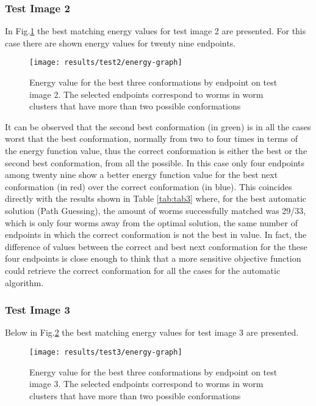 \subsubsection*{Test Image 2}

In Fig.\ref{fig:energy2} the best matching energy values for 
test image 2 are presented. For this case there are shown energy values
for twenty nine endpoints.

\begin{figure}[h!]
 \centering
   \texttt{[image: results/test2/energy-graph]}
 \caption{Energy value for the best three conformations by endpoint on test
image 2. The selected endpoints correspond to worms in worm clusters that
have more than two possible conformations}
\label{fig:energy2}
\end{figure}

It can be observed that the second best conformation (in green) is in all 
the cases worst that the best conformation, normally from two to four times 
in terms of the energy function value, thus the correct conformation is 
either the best or the second best conformation, from all the possible.
In this case only four endpoints among twenty nine show a better energy
function value for the best next conformation (in red) over the correct 
conformation (in blue). This coincides directly with the results shown
in Table \ref{tab:tab3} where, for the best automatic solution (Path Guessing),
the amount of worms successfully matched was 29/33, which is only four worms
away from the optimal solution, the same number of endpoints in which the
correct conformation is not the best in value. In fact, the difference of 
values between the correct and best next conformation for the these four
endpoints is close enough to think that a more sensitive objective function
could retrieve the correct conformation for all the cases for the automatic
algorithm.\\ 

\subsubsection*{Test Image 3}

Below in Fig.\ref{fig:energy3} the best matching energy values for 
test image 3 are presented.

\begin{figure}[h]
 \centering
   \texttt{[image: results/test3/energy-graph]}
 \caption{Energy value for the best three conformations by endpoint on test
image 3. The selected endpoints correspond to worms in worm clusters that
have more than two possible conformations}
\label{fig:energy3}
\end{figure}


